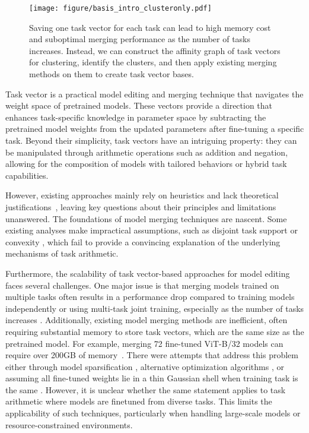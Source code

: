 \begin{figure}[tb]
    \centering
\texttt{[image: figure/basis\_intro\_clusteronly.pdf]}
    \caption{Saving one task vector for each task can lead to high memory cost and suboptimal merging performance as the number of tasks increases. Instead, we can construct the affinity graph of task vectors for clustering, identify the clusters, and then apply existing merging methods on them to create task vector bases.}
    \label{fig:basis_intro}
\vspace*{-1em}
\end{figure}

Task vector \citep{ilharco2022editing} is a practical model editing and merging technique that navigates the weight space of pretrained models. These vectors provide a direction that enhances task-specific knowledge in parameter space by subtracting the pretrained model weights from the updated parameters after fine-tuning a specific task. Beyond their simplicity, task vectors have an intriguing property: they can be manipulated through arithmetic operations such as addition and negation, allowing for the composition of models with tailored behaviors or hybrid task capabilities.

However, existing approaches mainly rely on heuristics and lack theoretical justifications~\citep{yang2024model}, leaving key questions about their principles and limitations unanswered. The foundations of model merging techniques are nascent. Some existing analyses make impractical assumptions, such as disjoint task support \citep{ortiz2024task,xiong2024multi} or convexity \citep{zhou2024cross, tao2024task}, which fail to provide a convincing explanation of the underlying mechanisms of task arithmetic. 

Furthermore, the scalability of task vector-based approaches for model editing faces several challenges. One major issue is that merging models trained on multiple tasks often results in a performance drop compared to training models independently or using multi-task joint training, especially as the number of tasks increases \citep{ilharco2022editing, yang2024model}. Additionally, existing model merging methods are inefficient, often requiring substantial memory to store task vectors, which are the same size as the pretrained model. For example, merging 72 fine-tuned ViT-B/32 \citep{dosovitskiy2020image} models can require over 200GB of memory~\citep{li2024scalable, yang2024model}. There were attempts that address this problem either through model sparsification \citep{he2024localize, wang2024localizing}, alternative optimization algorithms \citep{li2024scalable}, or assuming all fine-tuned weights lie in a thin Gaussian shell when training task is the same \citep{jang2025model}. However, it is unclear whether the same statement applies to task arithmetic where models are finetuned from diverse tasks. This limits the applicability of such techniques, particularly when handling large-scale models or resource-constrained environments.

